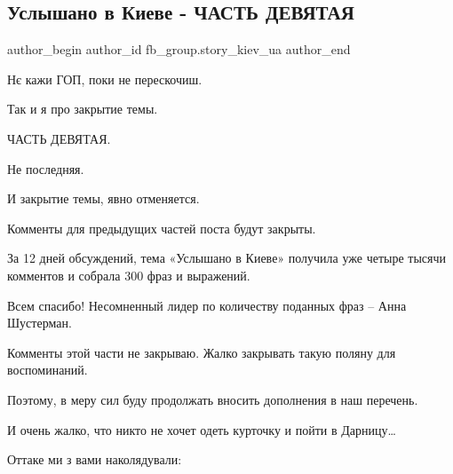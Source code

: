  
 
 
 
 
 
\subsection{Услышано в Киеве - ЧАСТЬ ДЕВЯТАЯ}
\label{sec:01_08_2021.fb.fb_group.story_kiev_ua.1.uslyshano_v_kieve_9}
 
\ifcmt
 author_begin
   author_id fb_group.story_kiev_ua
 author_end
\fi

Нє кажи ГОП, поки не перескочиш.

Так и я про закрытие темы.

ЧАСТЬ ДЕВЯТАЯ.

Не последняя.

И закрытие темы, явно отменяется.

Комменты для предыдущих частей поста будут закрыты.

За 12 дней обсуждений, тема «Услышано в Киеве» получила уже четыре тысячи
комментов и собрала 300 фраз и выражений.

Всем спасибо! Несомненный лидер по количеству поданных фраз – Анна Шустерман.

Комменты этой части не закрываю. Жалко закрывать такую поляну для воспоминаний.

Поэтому, в меру сил буду продолжать вносить дополнения в наш перечень. 

И очень жалко, что никто не хочет одеть курточку и пойти в Дарницу…

Оттаке ми з вами наколядували:

